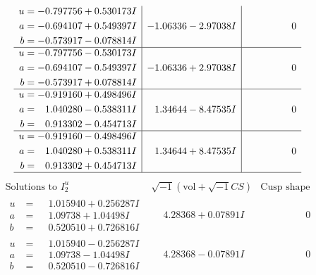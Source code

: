 \documentclass[1p]{elsarticle_modified}
\theoremstyle{definition}
\newcommand{\I}{\sqrt{-1}}
\begin{document}
$$\begin{array}{c|c|c}
\begin{aligned}
u &= -0.797756 + 0.530173 I \\
a &= -0.694107 + 0.549397 I \\
b &= -0.573917 - 0.078814 I\end{aligned}
 & -1.06336 - 2.97038 I & \phantom{-0.000000 } 0 \\ \hline\begin{aligned}
u &= -0.797756 - 0.530173 I \\
a &= -0.694107 - 0.549397 I \\
b &= -0.573917 + 0.078814 I\end{aligned}
 & -1.06336 + 2.97038 I & \phantom{-0.000000 } 0 \\ \hline\begin{aligned}
u &= -0.919160 + 0.498496 I \\
a &= \phantom{-}1.040280 - 0.538311 I \\
b &= \phantom{-}0.913302 - 0.454713 I\end{aligned}
 & \phantom{-}1.34644 - 8.47535 I & \phantom{-0.000000 } 0 \\ \hline\begin{aligned}
u &= -0.919160 - 0.498496 I \\
a &= \phantom{-}1.040280 + 0.538311 I \\
b &= \phantom{-}0.913302 + 0.454713 I\end{aligned}
 & \phantom{-}1.34644 + 8.47535 I & \phantom{-0.000000 } 0\\
 \hline 
 \end{array}$$\newpage$$\begin{array}{c|c|c}  
\text{Solutions to }I^u_{2}& \I (\text{vol} + \sqrt{-1}CS) & \text{Cusp shape}\\
 \hline 
\begin{aligned}
u &= \phantom{-}1.015940 + 0.256287 I \\
a &= \phantom{-}1.09738 + 1.04498 I \\
b &= \phantom{-}0.520510 + 0.726816 I\end{aligned}
 & \phantom{-}4.28368 + 0.07891 I & \phantom{-0.000000 } 0 \\ \hline\begin{aligned}
u &= \phantom{-}1.015940 - 0.256287 I \\
a &= \phantom{-}1.09738 - 1.04498 I \\
b &= \phantom{-}0.520510 - 0.726816 I\end{aligned}
 & \phantom{-}4.28368 - 0.07891 I & \phantom{-0.000000 } 0 \\ \hline\begin{aligned}

\end{aligned}
\end{array}$$
\end{document}
